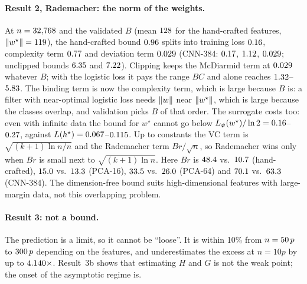 \paragraph{Result 2, Rademacher: the norm of the weights.} At $n=32{,}768$ and the validated
$B$ (mean $128$ for the hand-crafted features, $\left\lVert w^\star \right\rVert=119$), the
hand-crafted bound $0.96$ splits into training loss $0.16$, complexity
term $0.77$ and deviation term $0.029$ (CNN-384: $0.17$,
$1.12$, $0.029$; unclipped bounds $6.35$ and
$7.22$). Clipping keeps the McDiarmid term at $0.029$ whatever $B$; with the logistic loss it pays
the range $BC$ and alone reaches $1.32$--$5.83$.
The binding term is now the complexity term, which is large because $B$ is: a filter with
near-optimal logistic loss needs $\left\lVert w \right\rVert$ near $\left\lVert w^\star \right\rVert$, which is large because the classes
overlap, and validation picks $B$ of that order. The surrogate costs too: even with infinite data
the bound for $w^\star$ cannot go below $L_\psi(w^\star)/\ln2=0.16$--$0.27$,
against $L(h^\star)=0.067$--$0.115$. Up to constants the VC term is
$\sqrt{(k+1)\ln n/n}$ and the Rademacher term $Br/\sqrt n$, so Rademacher wins only when $Br$ is small
next to $\sqrt{(k+1)\ln n}$. Here $Br$ is $48.4$ vs.\ $10.7$ (hand-crafted),
$15.0$ vs.\ $13.3$ (PCA-16), $33.5$ vs.\ $26.0$ (PCA-64) and
$70.1$ vs.\ $63.3$ (CNN-384). The dimension-free bound suits high-dimensional
features with large-margin data, not this overlapping problem.

\paragraph{Result 3: not a bound.} The prediction is a limit, so it cannot be ``loose''. It is within
10\% from $n=50\,p$ to $300\,p$ depending on the features, and
underestimates the excess at $n=10p$ by up to $4.140\times$. Result~3b shows that
estimating $H$ and $G$ is not the weak point; the onset of the asymptotic regime is.

